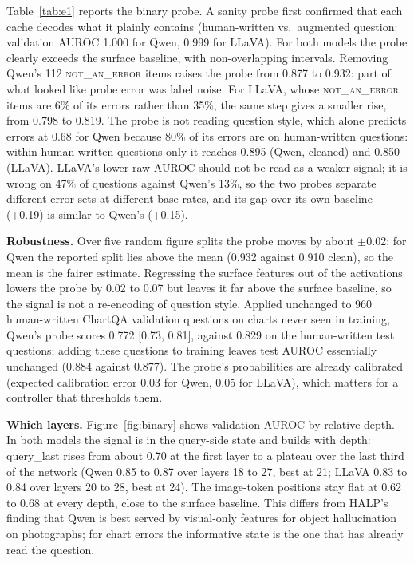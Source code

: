 \documentclass[11pt]{article}
\newcommand{\cls}[1]{\textsc{#1}}
\begin{document}
Table~\ref{tab:e1} reports the binary probe. A sanity probe first confirmed that
each cache decodes what it plainly contains (human-written vs.\ augmented
question: validation AUROC 1.000 for Qwen, 0.999 for LLaVA). For both models the
probe clearly exceeds the surface baseline, with non-overlapping intervals.
Removing Qwen's 112 \cls{not\_an\_error} items raises the probe from 0.877 to
0.932: part of what looked like probe error was label noise. For LLaVA, whose
\cls{not\_an\_error} items are 6\% of its errors rather than 35\%, the same step
gives a smaller rise, from 0.798 to 0.819. The probe is not
reading question style, which alone predicts errors at 0.68 for Qwen because
80\% of its errors are on human-written questions: within human-written
questions only it reaches 0.895 (Qwen, cleaned) and 0.850 (LLaVA). LLaVA's lower
raw AUROC should not be read as a weaker signal; it is wrong on 47\% of
questions against Qwen's 13\%, so the two probes separate different error sets
at different base rates, and its gap over its own baseline (+0.19) is similar to
Qwen's (+0.15).

\textbf{Robustness.} Over five random figure splits the probe moves by about
$\pm$0.02; for Qwen the reported split lies above the mean (0.932 against 0.910
clean), so the mean is the fairer estimate. Regressing the surface features out
of the activations lowers the probe by 0.02 to 0.07 but leaves it far above the
surface baseline, so the signal is not a re-encoding of question style. Applied
unchanged to 960 human-written ChartQA validation questions on charts never seen
in training, Qwen's probe scores 0.772 [0.73, 0.81], against 0.829 on the
human-written test questions; adding these questions to training leaves test
AUROC essentially unchanged (0.884 against 0.877). The probe's probabilities are already calibrated
(expected calibration error 0.03 for Qwen, 0.05 for LLaVA), which matters for a
controller that thresholds them.

\textbf{Which layers.} Figure~\ref{fig:binary} shows validation AUROC by relative
depth. In both models the signal is in the query-side state and builds with
depth: query\_last rises from about 0.70 at the first layer to a plateau over
the last third of the network (Qwen 0.85 to 0.87 over layers 18 to 27, best at
21; LLaVA 0.83 to 0.84 over layers 20 to 28, best at 24). The image-token
positions stay flat at 0.62 to 0.68 at every depth, close to the surface
baseline. This differs from HALP's finding that Qwen is best served by
visual-only features for object hallucination on photographs; for chart errors
the informative state is the one that has already read the question.
\end{document}
